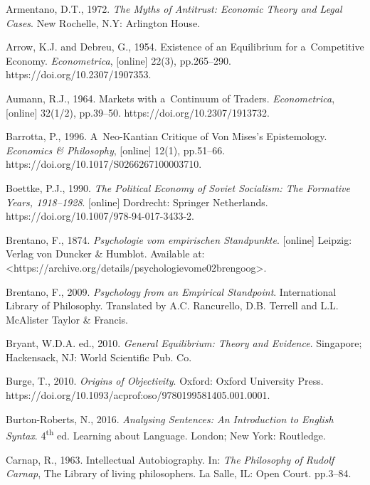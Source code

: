 Armentano, D.T., 1972. \textit{The Myths of Antitrust: Economic Theory and Legal Cases}. New Rochelle, N.Y: Arlington House.



Arrow, K.J. and Debreu, G., 1954. Existence of an Equilibrium for a~Competitive Economy. \textit{Econometrica}, [online] 22(3), pp.265–290. https://doi.org/10.2307/1907353.



Aumann, R.J., 1964. Markets with a~Continuum of Traders. \textit{Econometrica}, [online] 32(1/2), pp.39–50. https://doi.org/10.2307/1913732.



Barrotta, P., 1996. A~Neo-Kantian Critique of Von Mises's Epistemology. \textit{Economics \& Philosophy}, [online] 12(1), pp.51–66. https://doi.org/10.1017/S0266267100003710.



Boettke, P.J., 1990. \textit{The Political Economy of Soviet Socialism: The Formative Years, 1918–1928}. [online] Dordrecht: Springer Netherlands. https://doi.org/10.1007/978-94-017-3433-2.



Brentano, F., 1874. \textit{Psychologie vom empirischen Standpunkte}. [online] Leipzig: Verlag von Duncker \& Humblot. Available at: {\textless}https://archive.org/details/psychologievome02brengoog{\textgreater}.



Brentano, F., 2009. \textit{Psychology from an Empirical Standpoint}. International Library of Philosophy. Translated by A.C. Rancurello, D.B. Terrell and L.L. McAlister Taylor \& Francis.



Bryant, W.D.A. ed., 2010. \textit{General Equilibrium: Theory and Evidence}. Singapore; Hackensack, NJ: World Scientific Pub. Co.



Burge, T., 2010. \textit{Origins of Objectivity}. Oxford: Oxford University Press. https://doi.org/10.1093/acprof:oso/9780199581405.001.0001.



Burton-Roberts, N., 2016. \textit{Analysing Sentences: An Introduction to English Syntax}. 4\textsuperscript{th} ed. Learning about Language. London; New York: Routledge.



Carnap, R., 1963. Intellectual Autobiography. In: \textit{The Philosophy of Rudolf Carnap}, The Library of living philosophers. La Salle, IL: Open Court. pp.3–84.



